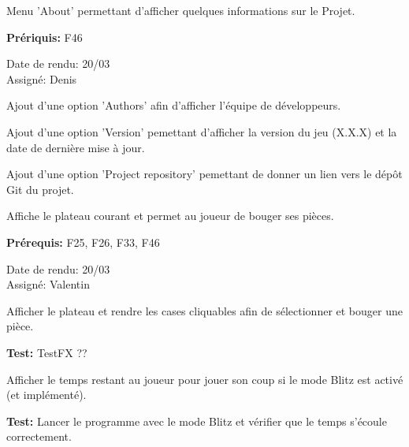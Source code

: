 \documentclass{article}
\begin{document}
\begin{needbox}
    Menu 'About' permettant d'afficher quelques informations sur le Projet.

    \textbf{Prériquis:} F46
    \begin{duedatebox}
        Date de rendu: 20/03\\
        Assigné: Denis
    \end{duedatebox}
    \begin{subneedbox}[F49.1: Auteurs]
        Ajout d'une option 'Authors' afin d'afficher l'équipe de développeurs.
    \end{subneedbox}
    \begin{subneedbox}
        Ajout d'une option 'Version' pemettant d'afficher la version du jeu (X.X.X) et la date de dernière mise à jour.
    \end{subneedbox}
    \begin{subneedbox}
        Ajout d'une option 'Project repository' pemettant de donner un lien vers le dépôt Git du projet.
    \end{subneedbox}
\end{needbox}

\begin{needbox}
    Affiche le plateau courant et permet au joueur de bouger ses pièces.
    
    \textbf{Prérequis:} F25, F26, F33, F46
    \begin{duedatebox}
        Date de rendu: 20/03\\
        Assigné: Valentin
    \end{duedatebox}
    \begin{subneedbox}
        Afficher le plateau et rendre les cases cliquables afin de sélectionner et 
        bouger une pièce.

        \textbf{Test:} TestFX ??
    \end{subneedbox}
    \begin{subneedbox}
        Afficher le temps restant au joueur pour jouer son coup si le mode Blitz est activé (et implémenté).

        \textbf{Test:} Lancer le programme avec le mode Blitz et vérifier que le temps s'écoule correctement.
    \end{subneedbox}
\end{needbox}
\end{document}
